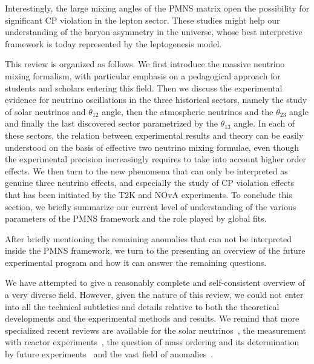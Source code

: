 Interestingly, the large mixing angles of the PMNS matrix open the possibility for significant CP violation in the lepton sector. These studies might help our understanding of the baryon asymmetry in the universe, whose best interpretive framework is today represented by the leptogenesis model.
 
This review is organized as follows. We first introduce the massive neutrino mixing formalism, with particular emphasis on a pedagogical approach for students and scholars entering this field. Then we discuss the experimental evidence for neutrino oscillations in the three historical sectors, namely the study of solar neutrinos and $\theta_{12}$ angle, then the atmospheric neutrinos and the $\theta_{23}$ angle and finally the last discovered sector parametrized by the $\theta_{13}$ angle. In each of these sectors, the relation between experimental results and theory can be easily understood on the basis of effective two neutrino mixing formulae, even though the experimental precision increasingly requires to take into account higher order effects. We then turn to the new phenomena that can only be interpreted as genuine three neutrino effects, and especially the study of CP violation effects that has been initiated by the T2K and NOvA experiments. To conclude this section, we briefly summarize our current level of understanding of the various parameters of the PMNS framework and the role played by global fits.

After briefly mentioning the remaining anomalies that can not be interpreted inside the PMNS framework, we turn to the presenting an overview of the future experimental program and how it can answer the remaining questions. 

We have attempted to give a reasonably complete and self-consistent overview of a very diverse field. However, given the nature of this review, we could not enter into all the technical subtleties and details relative to both the theoretical developments and the experimental methods and results. We remind that more specialized recent reviews are available for the solar neutrinos~\cite{ianni}, the \thint measurement with reactor experiments~\cite{lachenmaier}, the question of mass ordering and its determination by future experiments~\cite{xian} and the vast field of anomalies~\cite{kopp}.
